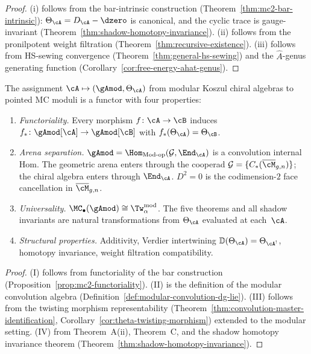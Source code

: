 \begin{proof}
(i) follows from the bar-intrinsic construction
(Theorem~\ref{thm:mc2-bar-intrinsic}): $\Theta_\cA = D_\cA - \dzero$
is canonical, and the cyclic trace is gauge-invariant
(Theorem~\ref{thm:shadow-homotopy-invariance}).
(ii) follows from the pronilpotent weight filtration
(Theorem~\ref{thm:recursive-existence}).
(iii) follows from HS-sewing convergence
(Theorem~\ref{thm:general-hs-sewing}) and the
$\hat{A}$-genus generating function
(Corollary~\ref{cor:free-energy-ahat-genus}).
\end{proof}

\begin{theorem}
\label{thm:universal-modular-deformation}
The assignment $\cA \mapsto (\gAmod, \Theta_\cA)$ from modular
Koszul chiral algebras to pointed MC moduli is a functor with
four properties:
\begin{enumerate}[label=\textup{(\Roman*)}]
\item \emph{Functoriality.}
  Every morphism $f \colon \cA \to \cB$ induces
  $f_* \colon \gAmod[\cA] \to \gAmod[\cB]$ with
  $f_*(\Theta_\cA) = \Theta_\cB$.

\item \emph{Arena separation.}
  $\gAmod = \Hom_{\mathrm{Mod\text{-}op}}(\mathcal{G},
  \End_\cA)$ is a convolution internal Hom.  The geometric
  arena enters through the cooperad
  $\mathcal{G} = \{C_*(\overline{\cM}_{g,n})\}$; the chiral
  algebra enters through $\End_\cA$.  $D^2 = 0$ is the
  codimension-$2$ face cancellation in
  $\overline{\cM}_{g,n}$.

\item \emph{Universality.}
  $\MC_\bullet(\gAmod) \cong \Tw_\alpha^{\mathrm{mod}}$.
  The five theorems and all shadow invariants are natural
  transformations from $\Theta_\cA$ evaluated at each~$\cA$.

\item \emph{Structural properties.}
  Additivity, Verdier intertwining
  $\mathbb{D}(\Theta_\cA) = \Theta_{\cA^!}$,
  homotopy invariance, weight filtration compatibility.
\end{enumerate}
\end{theorem}

\begin{proof}
(I) follows from functoriality of the bar construction
(Proposition~\ref{prop:mc2-functoriality}).
(II) is the definition of the modular convolution algebra
(Definition~\ref{def:modular-convolution-dg-lie}).
(III) follows from the twisting morphism representability
(Theorem~\ref{thm:convolution-master-identification},
Corollary~\ref{cor:theta-twisting-morphism}) extended to the
modular setting.
(IV) from Theorem~A(ii), Theorem~C, and the shadow homotopy
invariance theorem
(Theorem~\ref{thm:shadow-homotopy-invariance}).
\end{proof}

